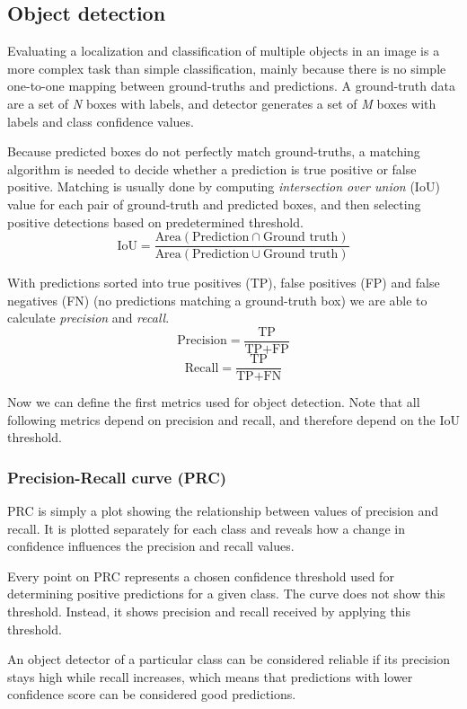 \subsection{Object detection}
Evaluating a localization and classification of multiple objects in an image is a more complex task than simple classification, mainly because there is no simple one-to-one mapping between ground-truths and predictions. A ground-truth data are a set of \textit{N} boxes with labels, and detector generates a set of \textit{M} boxes with labels and class confidence values.

Because predicted boxes do not perfectly match ground-truths, a matching algorithm is needed to decide whether a prediction is true positive or false positive. Matching is usually done by computing \textit{intersection over union} (IoU) value for each pair of ground-truth and predicted boxes, and then selecting positive detections based on predetermined threshold.
$$\text{IoU} = \frac{\text{Area}(\text{Prediction} \cap \text{Ground truth})}{\text{Area}(\text{Prediction} \cup \text{Ground truth})}$$

With predictions sorted into true positives (TP), false positives (FP) and false negatives (FN) (no predictions matching a ground-truth box) we are able to calculate \textit{precision} and \textit{recall}.
$$\text{Precision} = \frac{\text{TP}}{\text{TP}+\text{FP}}$$
$$\text{Recall} = \frac{\text{TP}}{\text{TP}+\text{FN}}$$

Now we can define the first metrics used for object detection. Note that all following metrics depend on precision and recall, and therefore depend on the IoU threshold.

\subsubsection{Precision-Recall curve (PRC)}
PRC is simply a plot showing the relationship between values of precision and recall. It is plotted separately for each class and reveals how a change in confidence influences the precision and recall values. 

Every point on PRC represents a chosen confidence threshold used for determining positive predictions for a given class. The curve does not show this threshold. Instead, it shows precision and recall received by applying this threshold.

An object detector of a particular class can be considered reliable if its precision stays high while recall increases, which means that predictions with lower confidence score can be considered good predictions.

